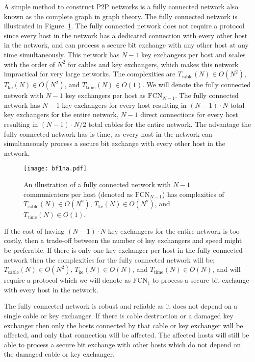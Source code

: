 \documentclass[a4paper,12pt,pdftex]{article}
\begin{document}
A simple method to construct P2P networks is a fully connected network also known as the complete graph in graph theory. The fully connected network is illustrated in Figure~\ref{fig:bf1}. The fully connected network does not require a protocol since every host in the network has a dedicated connection with every other host in the network, and can process a secure bit exchange with any other host at any time simultaneously. This network has $N-1$ key exchangers per host and scales with the order of $N^{2}$ for cables and key exchangers, which makes this network impractical for very large networks. The complexities are $T_\mathrm{cable}(N) \in O(N^{2})$, $T_\mathrm{ke}(N) \in O(N^{2})$, and $T_\mathrm{time}(N) \in O(1)$. We will denote the fully connected network with $N-1$ key exchangers per host as $\mathrm{FCN}_{N-1}$. The fully connected network has $N-1$ key exchangers for every host resulting in $(N-1) \cdot N$ total key exchangers for the entire network, $N-1$ direct connections for every host resulting in $(N-1) \cdot N/2$ total cables for the entire network. The advantage the fully connected network has is time, as every host in the network can simultaneously process a secure bit exchange with every other host in the network.

\begin{figure}[h]
    \caption{An illustration of a fully connected network with $N-1$ communicators per host (denoted as $\mathrm{FCN}_{N-1}$) has complexities of $T_\mathrm{cable}(N) \in O(N^{2})$, $T_\mathrm{ke}(N) \in O(N^{2})$, and $T_\mathrm{time}(N) \in O(1)$. }
    \label{fig:bf1}
  \centering
\texttt{[image: bf1na.pdf]}
\end{figure}

If the cost of having $(N-1) \cdot N$ key exchangers for the entire network is too costly, then a trade-off between the number of key exchangers and speed might be preferable. If there is only one key exchanger per host in the fully connected network then the complexities for the fully connected network  will be; $T_\mathrm{cable}(N) \in O(N^{2})$, $T_\mathrm{ke}(N) \in O(N)$, and $T_\mathrm{time}(N) \in O(N)$, and will require a protocol which we will denote as $\mathrm{FCN}_{1}$ to process a secure bit exchange with every host in the network.

The fully connected network is robust and reliable as it does not depend on a single cable or key exchanger. If there is cable destruction or a damaged key exchanger then only the hosts connected by that cable or key exchanger will be affected, and only that connection will be affected. The affected hosts will still be able to process a secure bit exchange with other hosts which do not depend on the damaged cable or key exchanger. 
\end{document}
